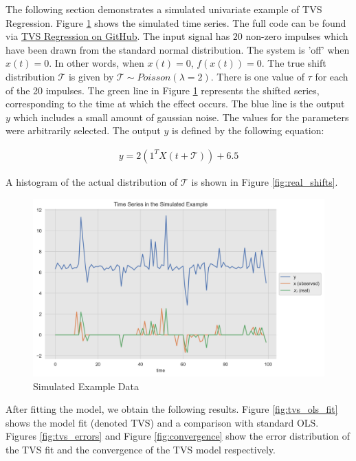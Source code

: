 \documentclass[11pt]{amsart}
\theoremstyle{definition}
\begin{document}
The following section demonstrates a simulated univariate example of TVS Regression. Figure \ref{fig:simulated_example} shows the simulated time series. The full code can be found via \href{https://github.com/aaron1rcl/tvs_regression/blob/master/notebooks/1_univariate_example.ipynb}{TVS Regression on GitHub}. 
The input signal has $20$ non-zero impulses which have been drawn from the standard normal distribution. The system is 'off' when $x(t) =0$. In other words, when $x(t) = 0$, $f(x(t)) = 0$. The true shift distribution $\mathcal{T}$ is given by $\mathcal{T} \sim Poisson(\lambda = 2)$. There is one value of $\tau$ for each of the 20 impulses. The green line in Figure \ref{fig:simulated_example} represents the shifted series, corresponding to the time at which the effect occurs. The blue line is the output $y$ which includes a small amount of gaussian noise. The values for the parameters were arbitrarily selected. The output $y$ is defined by the following equation:


\begin{align*}
    y = 2(1^TX(t + \mathcal{T})) + 6.5
\end{align*}

A histogram of the actual distribution of $\mathcal{T}$ is shown in Figure \ref{fig:real_shifts}.

\begin{center}
\begin{figure}
\includegraphics[scale=0.5]{images/simulated_example.png}
\caption{Simulated Example Data}
\label{fig:simulated_example}
\end{figure}
\end{center}

After fitting the model, we obtain the following results. Figure \ref{fig:tvs_ols_fit} shows the model fit (denoted TVS) and a comparison with standard OLS. Figures \ref{fig:tvs_errors} and Figure \ref{fig:convergence} show the error distribution of the TVS fit and the convergence of the TVS model respectively.
\end{document}
